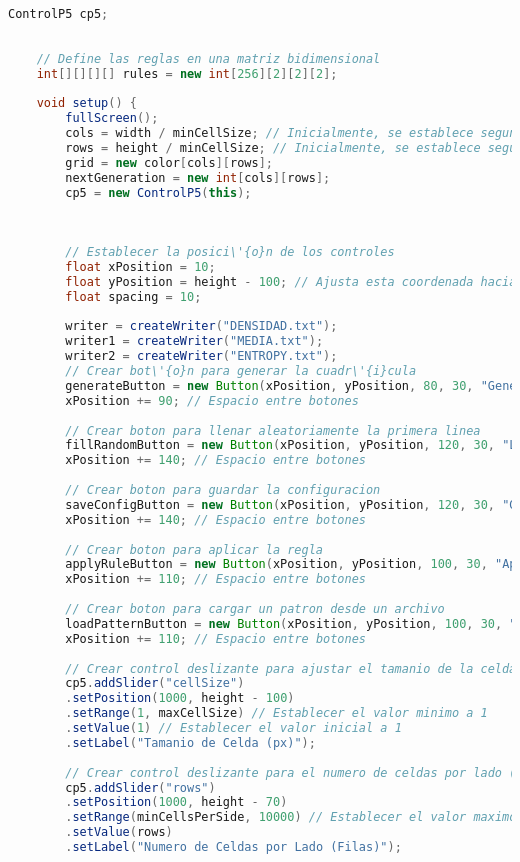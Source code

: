 \documentclass{article}
\begin{document}
\begin{lstlisting}[language=Java, basicstyle=\tiny, breaklines=true, breakatwhitespace=true]
	ControlP5 cp5;
	
	
	// Define las reglas en una matriz bidimensional
	int[][][][] rules = new int[256][2][2][2];
	
	void setup() {
		fullScreen();
		cols = width / minCellSize; // Inicialmente, se establece segun el tamanio minimo de celda
		rows = height / minCellSize; // Inicialmente, se establece segun el tamanio minimo de celda
		grid = new color[cols][rows];
		nextGeneration = new int[cols][rows];
		cp5 = new ControlP5(this);
		
		
		
		// Establecer la posici\'{o}n de los controles
		float xPosition = 10;
		float yPosition = height - 100; // Ajusta esta coordenada hacia arriba
		float spacing = 10;
		
		writer = createWriter("DENSIDAD.txt");
		writer1 = createWriter("MEDIA.txt");
		writer2 = createWriter("ENTROPY.txt");
		// Crear bot\'{o}n para generar la cuadr\'{i}cula
		generateButton = new Button(xPosition, yPosition, 80, 30, "Generar");
		xPosition += 90; // Espacio entre botones
		
		// Crear boton para llenar aleatoriamente la primera linea
		fillRandomButton = new Button(xPosition, yPosition, 120, 30, "Llenar Aleatoriamente");
		xPosition += 140; // Espacio entre botones
		
		// Crear boton para guardar la configuracion
		saveConfigButton = new Button(xPosition, yPosition, 120, 30, "Guardar Configuracion");
		xPosition += 140; // Espacio entre botones
		
		// Crear boton para aplicar la regla
		applyRuleButton = new Button(xPosition, yPosition, 100, 30, "Aplicar Regla");
		xPosition += 110; // Espacio entre botones
		
		// Crear boton para cargar un patron desde un archivo
		loadPatternButton = new Button(xPosition, yPosition, 100, 30, "Cargar Patron");
		xPosition += 110; // Espacio entre botones
		
		// Crear control deslizante para ajustar el tamanio de la celda
		cp5.addSlider("cellSize")
		.setPosition(1000, height - 100)
		.setRange(1, maxCellSize) // Establecer el valor minimo a 1
		.setValue(1) // Establecer el valor inicial a 1
		.setLabel("Tamanio de Celda (px)");
		
		// Crear control deslizante para el numero de celdas por lado (filas)
		cp5.addSlider("rows")
		.setPosition(1000, height - 70)
		.setRange(minCellsPerSide, 10000) // Establecer el valor maximo a 10000
		.setValue(rows)
		.setLabel("Numero de Celdas por Lado (Filas)");
		

\end{lstlisting}
\end{document}
